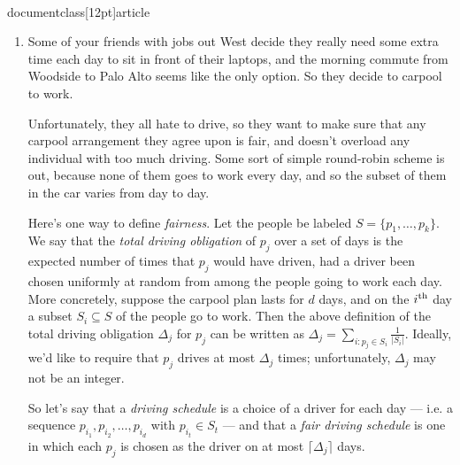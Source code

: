 \\documentclass[12pt]{article}
\newcommand{\cel}[1]{
{\lceil {#1} \rceil}
}
\begin{document}
\begin{enumerate}
{}


\item 

Some of your friends with jobs out West
decide they really need some extra time
each day to sit in front of their laptops,
and the morning commute from Woodside to
Palo Alto seems like the only option.
So they decide to carpool to work.

Unfortunately, they all hate to drive,
so they want to make sure that any
carpool arrangement they agree upon is fair,
and doesn't overload any individual with too much driving.
Some sort of simple round-robin scheme is out,
because none of them goes to work every day,
and so the subset of them in the car
varies from day to day.

Here's one way to define {\em fairness}.
Let the people be labeled $S = \{p_1, \ldots, p_k\}$.
We say that the {\em total driving obligation}
of $p_j$ over a set of days
is the expected number of times that
$p_j$ would have driven, had a driver been
chosen uniformly at random from among
the people going to work each day.
More concretely,
suppose the carpool plan lasts for $d$ days, and on the
$i^{\rm th}$ day a subset $S_i \subseteq S$ of the
people go to work.
Then the above definition of the total
driving obligation $\Delta_j$ for $p_j$ can be written as
$\Delta_j = \sum_{i: p_j \in S_i} \frac{1}{|S_i|}$.
Ideally, we'd like to require that
$p_j$ drives at most $\Delta_j$ times;
unfortunately, $\Delta_j$ may not be an integer.

So let's say that a {\em driving schedule} is
a choice of a driver for each day ---
i.e. a sequence $p_{i_1}, p_{i_2}, \ldots, p_{i_d}$
with $p_{i_t} \in S_t$ ---
and that a {\em fair driving schedule}
is one in which each $p_j$ is chosen as
the driver on at most $\cel{\Delta_j}$ days.


\end{enumerate}
\end{document}
